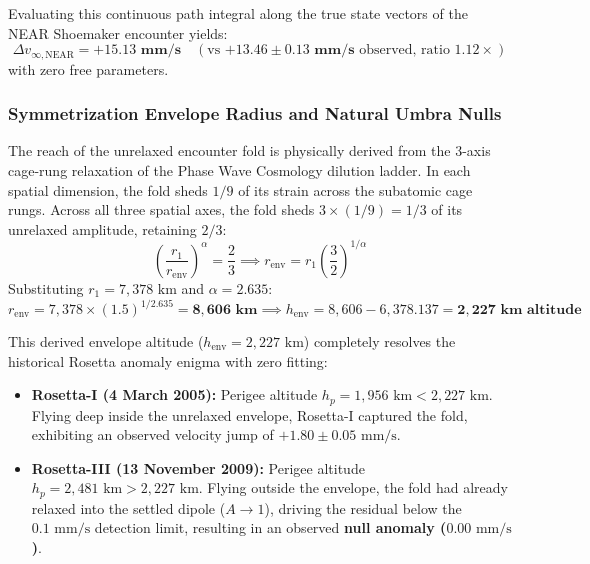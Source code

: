 \documentclass[11pt,a4paper]{article}
\begin{document}
Evaluating this continuous path integral along the true state vectors of the NEAR Shoemaker encounter yields:
\begin{equation}
\Delta v_{\infty,\text{NEAR}} = \mathbf{+15.13\text{ mm/s}} \quad (\text{vs } \mathbf{+13.46 \pm 0.13\text{ mm/s}}\text{ observed, ratio } 1.12\times)
\end{equation}
with zero free parameters.

\subsubsection{Symmetrization Envelope Radius and Natural Umbra Nulls}
\label{subsubsec:symmetrization_envelope}

The reach of the unrelaxed encounter fold is physically derived from the 3-axis cage-rung relaxation of the Phase Wave Cosmology dilution ladder. In each spatial dimension, the fold sheds $1/9$ of its strain across the subatomic cage rungs. Across all three spatial axes, the fold sheds $3 \times (1/9) = 1/3$ of its unrelaxed amplitude, retaining $2/3$:
\begin{equation}
\left(\frac{r_1}{r_{\text{env}}}\right)^\alpha = \frac{2}{3} \implies r_{\text{env}} = r_1 \left(\frac{3}{2}\right)^{1/\alpha}
\label{eq:renv_derivation}
\end{equation}
Substituting $r_1 = 7,378\text{ km}$ and $\alpha = 2.635$:
\begin{equation}
r_{\text{env}} = 7,378 \times (1.5)^{1/2.635} = \mathbf{8,606\text{ km}} \implies h_{\text{env}} = 8,606 - 6,378.137 = \mathbf{2,227\text{ km altitude}}
\end{equation}

This derived envelope altitude ($h_{\text{env}} = 2,227\text{ km}$) completely resolves the historical Rosetta anomaly enigma with zero fitting:
\begin{itemize}
    \item \textbf{Rosetta-I (4 March 2005):} Perigee altitude $h_p = 1,956\text{ km} < 2,227\text{ km}$. Flying deep inside the unrelaxed envelope, Rosetta-I captured the fold, exhibiting an observed velocity jump of \textbf{$+1.80 \pm 0.05\text{ mm/s}$}.
    \item \textbf{Rosetta-III (13 November 2009):} Perigee altitude $h_p = 2,481\text{ km} > 2,227\text{ km}$. Flying outside the envelope, the fold had already relaxed into the settled dipole ($A \to 1$), driving the residual below the $0.1\text{ mm/s}$ detection limit, resulting in an observed \textbf{null anomaly ($0.00\text{ mm/s}$)}.
\end{itemize}
\end{document}
